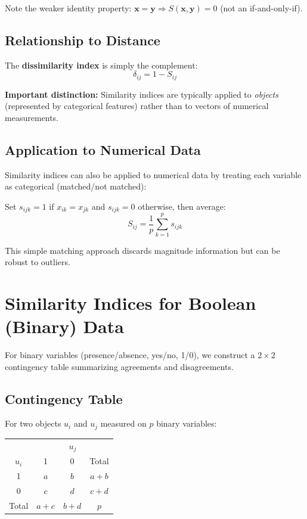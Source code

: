\documentclass[11pt]{article}
\begin{document}
Note the weaker identity property: $\mathbf{x} = \mathbf{y} \Rightarrow S(\mathbf{x}, \mathbf{y}) = 0$ (not an if-and-only-if).

\subsection{Relationship to Distance}

The \textbf{dissimilarity index} is simply the complement:
$$\delta_{ij} = 1 - S_{ij}$$

\textbf{Important distinction:} Similarity indices are typically applied to \textit{objects} (represented by categorical features) rather than to vectors of numerical measurements.

\subsection{Application to Numerical Data}

Similarity indices can also be applied to numerical data by treating each variable as categorical (matched/not matched):

Set $s_{ijk} = 1$ if $x_{ik} = x_{jk}$ and $s_{ijk} = 0$ otherwise, then average:
$$S_{ij} = \frac{1}{p}\sum_{k=1}^{p} s_{ijk}$$

This simple matching approach discards magnitude information but can be robust to outliers.

\section{Similarity Indices for Boolean (Binary) Data}

For binary variables (presence/absence, yes/no, 1/0), we construct a $2 \times 2$ contingency table summarizing agreements and disagreements.

\subsection{Contingency Table}

For two objects $u_i$ and $u_j$ measured on $p$ binary variables:

\begin{center}
\begin{tabular}{c|c|c|c}
 & \multicolumn{3}{c}{$u_j$} \\
$u_i$ & 1 & 0 & Total \\
\hline
1 & $a$ & $b$ & $a+b$ \\
0 & $c$ & $d$ & $c+d$ \\
Total & $a+c$ & $b+d$ & $p$ \\
\end{tabular}
\end{center}
\end{document}
